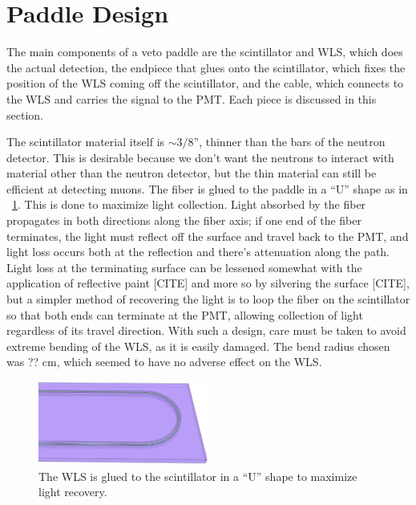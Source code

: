 \section{Paddle Design}

The main components of a veto paddle are the scintillator and WLS, which does the actual detection, the endpiece that glues onto the scintillator, which fixes the position of the WLS coming off the scintillator, and the cable, which connects to the WLS and carries the signal to the PMT.  Each piece is discussed in this section.

The scintillator material itself is $\sim3/8$'', thinner than the bars of the neutron detector.  This is desirable because we don't want the neutrons to interact with material other than the neutron detector, but the thin material can still be efficient at detecting muons.  The fiber is glued to the paddle in a ``U'' shape as in {\fig}~\ref{fig:paddle}.  This is done to maximize light collection.  Light absorbed by the fiber propagates in both directions along the fiber axis; if one end of the fiber terminates, the light must reflect off the surface and travel back to the PMT, and light loss occurs both at the reflection and there's attenuation along the path.  Light loss at the terminating surface can be lessened somewhat with the application of reflective paint [CITE] and more so by silvering the surface [CITE], but a simpler method of recovering the light is to loop the fiber on the scintillator so that both ends can terminate at the PMT, allowing collection of light regardless of its travel direction.  With such a design, care must be taken to avoid extreme bending of the WLS, as it is easily damaged.  The bend radius chosen was ?? cm, which seemed to have no adverse effect on the WLS.
\begin{figure}[htp]
\centering
\includegraphics[width=0.5\textwidth]{figures/veto_end.eps}
\caption{The WLS is glued to the scintillator in a ``U'' shape to maximize light recovery.}
\label{fig:paddle}
\end{figure}


